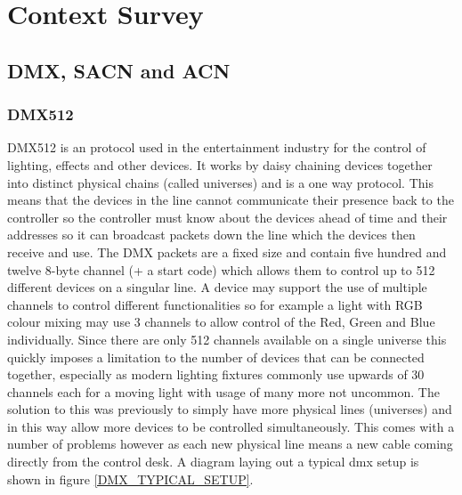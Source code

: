 \documentclass[11pt,a4paper]{article}
\begin{document}
\section{Context Survey}
\subsection{DMX, SACN and ACN}
\subsubsection{DMX512} DMX512 is an protocol used in the entertainment industry for the control of lighting, effects and other devices. It works by daisy chaining devices together into distinct physical chains (called universes) and is a one way protocol. This means that the devices in the line cannot communicate their presence back to the controller so the controller must know about the devices ahead of time and their addresses so it can broadcast packets down the line which the devices then receive and use. The DMX packets are a fixed size and contain five hundred and twelve 8-byte channel (+ a start code) which allows them to control up to 512 different devices on a singular line. A device may support the use of multiple channels to control different functionalities so for example a light with RGB colour mixing may use 3 channels to allow control of the Red, Green and Blue individually. Since there are only 512 channels available on a single universe this quickly imposes a limitation to the number of devices that can be connected together, especially as modern lighting fixtures commonly use upwards of 30 channels each for a moving light with usage of many more not uncommon. The solution to this was previously to simply have more physical lines (universes) and in this way allow more devices to be controlled simultaneously. This comes with a number of problems however as each new physical line means a new cable coming directly from the control desk. A diagram laying out a typical dmx setup is shown in figure \ref{DMX_TYPICAL_SETUP}.
\end{document}
